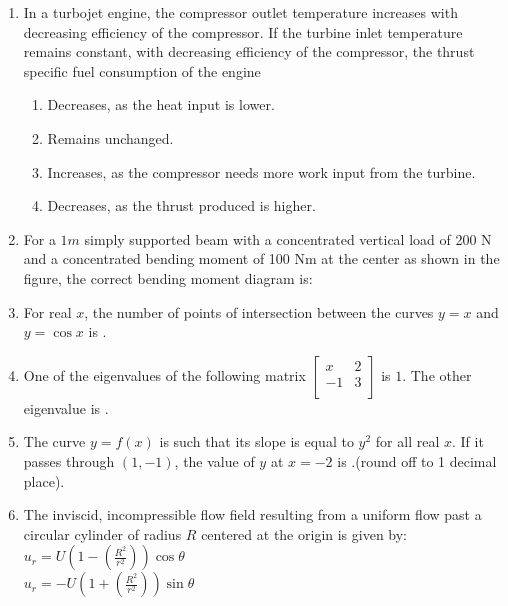 \documentclass[journal,12pt,onecolumn]{IEEEtran}
\theoremstyle{remark}
\begin{document}
\begin{enumerate}
    \item In a turbojet engine, the compressor outlet temperature increases with decreasing efficiency of the compressor. If the turbine inlet temperature remains constant, with decreasing efficiency of the compressor, the thrust specific fuel consumption of the engine
    \begin{enumerate}
        \item Decreases, as the heat input is lower.
        \item Remains unchanged.
        \item Increases, as the compressor needs more work input from the turbine.
        \item Decreases, as the thrust produced is higher.
    \end{enumerate}
    
    \item For a $1 m$ simply supported beam with a concentrated vertical load of 200 N and a concentrated bending moment of 100 Nm at the center as shown in the figure, the correct bending moment diagram is:

  \begin{figure}[H]
        \centering
    \end{figure}
    
    

    \item For real $x$, the number of points of intersection between the curves $y = x$ and $y = \cos x$ is {\underline{\hspace{1cm}}}.
   
    
    \item One of the eigenvalues of the following matrix 
    $\begin{bmatrix}
x & 2 \\
-1 & 3 \\
\end{bmatrix}$
is $1$. The other eigenvalue is {\underline{\hspace{1cm}}}.
    
    \item The curve $y = f(x)$ is such that its slope is equal to $y^2$ for all real $x$. If it passes through $(1, -1)$, the value of $y$ at $x = -2$ is {\underline{\hspace{1cm}}}.(round  off to 1 decimal place).
    

    \item The inviscid, incompressible flow field resulting from a uniform flow past a circular cylinder of radius $R$ centered at the origin is given by:\\
    $u_r=U(1-(\frac{R^2}{r^2}))\cos \theta$ \\      $u_r=-U(1+(\frac{R^2}{r^2}))\sin \theta$


\end{enumerate}
\end{document}
